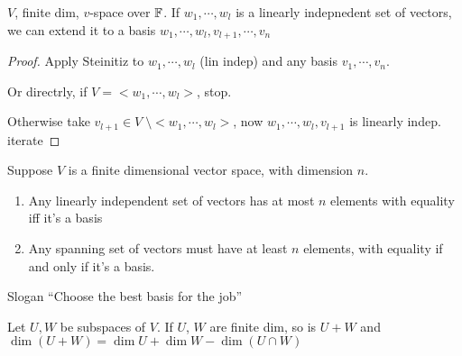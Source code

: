\documentclass[a4paper]{article}
\begin{document}
\begin{thm} 
	$ V $, finite dim, $ v $-space over $ \mathbb{F} $. If $ w_{1},\cdots,w_{l}$ is a linearly indepnedent set of vectors, we can extend it to a basis $ w_{1},\cdots,w_{l},v_{l+1},\cdots,v_{n} $
\end{thm}


\begin{proof}
	Apply Steinitiz to $ w_{1},\cdots,w_{l} $ (lin indep) and any basis $ v_{1},\cdots,v_{n} $.
	
	Or directrly, if $ V = <w_{1},\cdots,w_{l} > $, stop.
	
	Otherwise take $ v_{l+1} \in V \; \setminus <w_{1},\cdots,w_{l} > $, now $ w_{1},\cdots,w_{l},v_{l+1} $ is linearly indep. iterate
\end{proof}


\begin{cor} 
	Suppose $ V $ is a finite dimensional vector space, with dimension $ n $.
	
	\begin{enumerate}
		\item Any linearly independent set of vectors has at most $ n $ elements with equality iff it's a basis
		\item Any spanning set of vectors must have at least $ n $ elements, with equality if and only if it's a basis.
		
	\end{enumerate}
\end{cor}

Slogan ``Choose the best basis for the job''

\begin{thm} 
	Let $ U,W $ be subspaces of $ V $. If $ U $, $ W $ are finite dim, so is $ U + W $ and $ \dim (U + W)   = \dim U + \dim W - \dim (U \cap W)  $
\end{thm}
\end{document}
